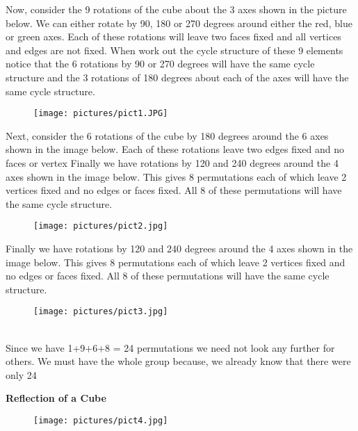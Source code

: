 \documentclass{article}
\begin{document}
Now, consider the 9 rotations of the cube about the 3 axes shown in the picture below.  We can either rotate by 90, 180 or 270 degrees around either the red, blue or green axes.  Each of these rotations will leave two faces fixed and all vertices and edges are not fixed.  When work out the cycle structure of these 9 elements notice that the 6 rotations by 90 or 270 degrees will have the same cycle structure and the 3 rotations of 180 degrees about each of the axes will have the same cycle structure.
\vspace{4cm}

\begin{figure}[htp]
    \texttt{[image: pictures/pict1.JPG]}
\end{figure}


Next, consider the 6 rotations of the cube by 180 degrees around the 6 axes shown in the image below.  Each of these rotations leave two edges fixed and no faces or vertex Finally we have rotations by 120 and 240 degrees around the 4 axes shown in the image below.  This gives 8 permutations each of which leave 2 vertices fixed and no edges or faces fixed.  All 8 of these permutations will have the same cycle structure.
\\
\begin{figure}[htp]
    \texttt{[image: pictures/pict2.jpg]}
\end{figure}

Finally we have rotations by 120 and 240 degrees around the 4 axes shown in the image below.  This gives 8 permutations each of which leave 2 vertices fixed and no edges or faces fixed.  All 8 of these permutations will have the same cycle structure.
\vspace{7cm}

\begin{figure}[htp]
    \texttt{[image: pictures/pict3.jpg]}
\end{figure}\\

Since we have 1+9+6+8 = 24 permutations we need not look any further for others. We must have the whole group because, we already know that there were only 24\\
 \vspace{1cm}
 
\textbf{Reflection of a Cube}\\

\begin{figure}[htp]
    \texttt{[image: pictures/pict4.jpg]}
\end{figure}\\
\end{document}
